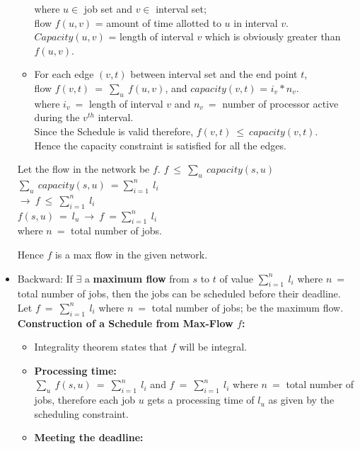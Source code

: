\documentclass[pdftex,a4paper,12pt]{report}
\begin{document}
\begin{itemize}
\begin{itemize}
where $u \in$ job set and $v \in$ interval set;\\
flow $f(u,v)$ = amount of time allotted to $u$ in interval $v$.\\
$Capacity(u,v)$ = length of interval $v$ which is obviously greater than $f(u,v)$.
\item For each edge $(v,t)$ between interval set and the end point $t$,\\
flow $f(v,t)\ =\ \sum_{u}^{}\ f(u,v)$, and $capacity(v,t)$ = $i_v*n_v$.\\
where $i_v\ =$ length of interval $v$ and $n_v\ =$ number of processor active during the $v^{th}$ interval.\\
Since the Schedule is valid therefore, $f(v,t)\ \leq\ capacity(v,t)$.\\
Hence the capacity constraint is satisfied for all the edges.
\end{itemize}
\begin{center}
Let the flow in the network be $f$. $f\ \leq\ \sum_{u}^{}\ capacity(s,u)$\\
$\sum_{u}^{}\ capacity(s,u)\ =\sum_{i=1}^{n}\ l_i$\\
$\rightarrow\ f\ \leq\ \sum_{i=1}^{n}\ l_i$\\
$f(s,u)\ =\ l_u\ \rightarrow\ f\ =\sum_{i=1}^{n}\ l_i $\\
where $n\ =$ total number of jobs.\\
\end{center}
Hence $f$ is a max flow in the given network.
\item Backward: If $\exists$ a \textbf{maximum flow} from $s$ to $t$ of value $\sum_{i=1}^{n}\ l_i$ where $n\ =$ total number of jobs, then the jobs can be scheduled before their deadline.\\
Let $f\ =\ \sum_{i=1}^{n}\ l_i$ where $n\ =$ total number of jobs; be the maximum flow.\\
\textbf{Construction of a Schedule from Max-Flow $f$:}
\begin{itemize}
\item Integrality theorem states that $f$ will be integral.
\item \textbf{Processing time:}\\
$\sum_{u}^{}\ f(s,u)\ =\ \sum_{i=1}^{n}\ l_i$ and $f\ =\ \sum_{i=1}^{n}\ l_i$ where $n\ =$ total number of jobs, therefore each job $u$ gets a processing time of $l_u$ as given by the scheduling constraint.
\item \textbf{Meeting the deadline:}\\

\end{itemize}
\end{itemize}
\end{document}
